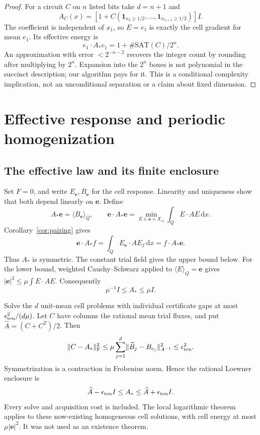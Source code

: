 \documentclass[11pt,a4paper]{article}
\numberwithin{equation}{section}
\theoremstyle{definition}
\theoremstyle{remark}\newtheorem{remark}[theorem]{Remark}
\newcommand{\Id}{I}
\newcommand{\dd}{\,\mathrm dx}
\newcommand{\mean}[2]{\langle #1\rangle_{#2}}
\newcommand{\norm}[1]{\lVert #1\rVert}
\newcommand{\evec}{\boldsymbol e}
\begin{document}
\begin{proof}
For a circuit \(C\) on \(n\) listed bits take \(d=n+1\) and
\[
 A_C(x)=\left[1+C(\mathbf1_{x_2\geq1/2},\ldots,
                         \mathbf1_{x_{n+1}\geq1/2})\right]\Id .
\]
The coefficient is independent of \(x_1\), so \(E=e_1\) is exactly
the cell gradient for mean \(e_1\). Its effective energy is
\[
 e_1\cdot A_*e_1=1+\#\mathrm{SAT}(C)/2^n.
\]
An approximation with error \(<2^{-n-2}\) recovers the integer count
by rounding after multiplying by \(2^n\).
Expansion into the \(2^n\) boxes is not polynomial in the succinct
description; our algorithm pays for it. This is a conditional
complexity implication, not an unconditional separation or a
claim about fixed dimension.
\end{proof}



\section{Effective response and periodic homogenization}
\label{sec:homogenization}

\subsection{The effective law and its finite enclosure}

Set \(F=0\), and write \(E_{\evec},B_{\evec}\) for the cell response.
Linearity and uniqueness show that both depend linearly on \(\evec\).
Define
\[
 A_*\evec=\mean{B_{\evec}}Q,\qquad
 \evec\cdot A_*\evec=\min_{E\in\evec+X_A}\int_QE\cdot AE\dd.
\]
Corollary~\ref{cor:pairing} gives
\[
 \evec\cdot A_*f=\int_QE_{\evec}\cdot AE_f\dd
              =f\cdot A_*\evec.
\]
Thus \(A_*\) is symmetric. The constant trial field gives the upper
bound below. For the lower bound, weighted Cauchy--Schwarz applied
to \(\mean EQ=\evec\) gives
\(|\evec|^2\leq\mu\int E\cdot AE\).
Consequently
\begin{equation}\label{eq:effective-bounds}
 \mu^{-1}\Id\leq A_*\leq\mu\Id.
\end{equation}

Solve the \(d\) unit-mean cell problems with individual certificate
gaps at most \(\epsilon_{\rm ten}^2/(d\mu)\).
Let \(C\) have columns the rational mean trial fluxes, and put
\(\widehat A=(C+C^T)/2\). Then
\[
 \norm{C-A_*}_{\rm F}^2
 \leq\mu\sum_{j=1}^d
       \norm{\widetilde B_j-B_{e_j}}_{A^{-1}}^2
 \leq\epsilon_{\rm ten}^2.
\]
Symmetrization is a contraction in Frobenius norm. Hence the rational
Loewner enclosure is
\begin{equation}\label{eq:tensor-enclosure}
 \widehat A-\epsilon_{\rm ten}\Id
       \leq A_*\leq\widehat A+\epsilon_{\rm ten}\Id.
\end{equation}
Every solve and acquisition cost is included.
The local logarithmic theorem applies to these now-existing homogeneous
cell solutions, with cell energy at most \(\mu|\evec|^2\).
It was not used as an existence theorem.
\end{document}
